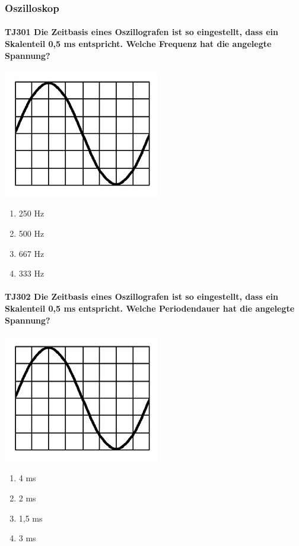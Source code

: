 \documentclass[8pt]{article}
\begin{document}
\pagebreak
\subsubsection{Oszilloskop}
\paragraph*{TJ301 Die Zeitbasis eines Oszillografen ist so eingestellt, dass ein Skalenteil 0,5 ms entspricht. Welche Frequenz hat die angelegte Spannung?}
\begin{center}
	\begin{minipage}{\linewidth}
		\centering
		\includegraphics[scale=1.0]{pics/tj301_a.jpg}
	\end{minipage}
\end{center}
\begin{enumerate}[nolistsep,label=\Alph*]
\item 250 Hz
\item 500 Hz
\item 667 Hz
\item 333 Hz
\end{enumerate}

\paragraph*{TJ302 Die Zeitbasis eines Oszillografen ist so eingestellt, dass ein Skalenteil 0,5 ms entspricht. Welche Periodendauer hat die angelegte Spannung?}
\begin{center}
	\begin{minipage}{\linewidth}
		\centering
		\includegraphics[scale=1.0]{pics/tj302_a.jpg}
	\end{minipage}
\end{center}
\begin{enumerate}[nolistsep,label=\Alph*]
\item 4 ms
\item 2 ms
\item 1,5 ms
\item 3 ms
\end{enumerate}
\end{document}
